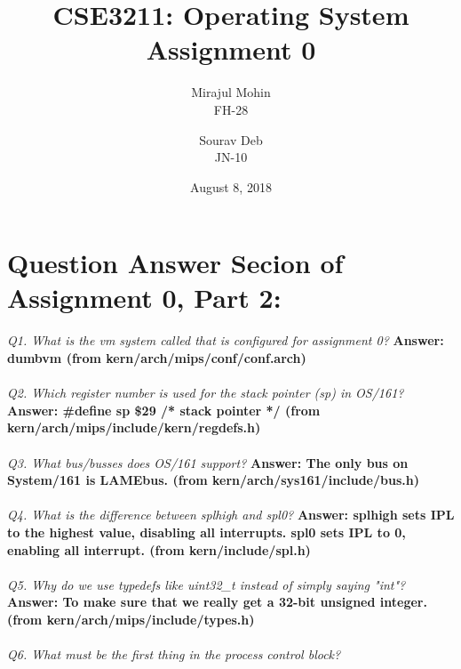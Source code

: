 \documentclass[11pt, english]{article}
\title{CSE3211: Operating System Assignment 0} %
\author{Mirajul Mohin\\
	FH-28
	\and
	Sourav Deb\\
	JN-10
}
\date{August 8, 2018} %
\begin{document}
	\maketitle
	\section{Question Answer Secion of Assignment 0, Part 2:}
	\textit{Q1. What is the vm system called that is configured for assignment 0?}\newline
	\textbf{Answer: dumbvm (from kern/arch/mips/conf/conf.arch)}\\ \\ 
	\textit{Q2. Which register number is used for the stack pointer (sp) in OS/161?}\newline
	\textbf{Answer: \#define sp \$29 /* stack pointer */ (from kern/arch/mips/include/kern/regdefs.h)}\\ \\
	\textit{Q3. What bus/busses does OS/161 support?}\newline 
	\textbf{Answer:  The only bus on System/161 is LAMEbus. (from kern/arch/sys161/include/bus.h)}\\ \\ 
	\textit{Q4. What is the difference between splhigh and spl0?}\newline 
	\textbf{Answer: splhigh sets IPL to the highest value, disabling all interrupts. spl0 sets IPL to 0, enabling all interrupt. (from kern/include/spl.h)}\\ \\ 
	\textit{Q5. Why do we use typedefs like uint32\_t instead of simply saying "int"?}\newline 
	\textbf{Answer: To make sure that we really get a 32-bit unsigned integer. (from kern/arch/mips/include/types.h)}\\ \\ 
	\textit{Q6. What must be the first thing in the process control block?}\newline 
\end{document}
